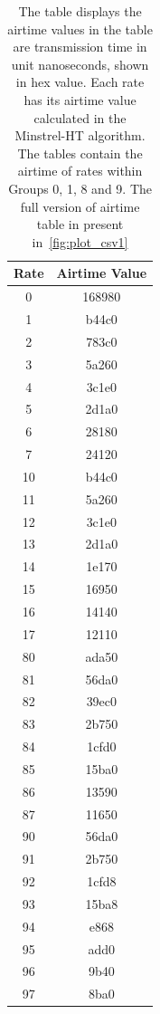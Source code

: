 \begin{table}[ht]
    \centering
    \begin{tabular}{|c|c|}
        \hline
        \textbf{Rate} & \textbf{Airtime Value} \\
        \hline
        0 & 168980 \\
        1 & b44c0 \\
        2 & 783c0 \\
        3 & 5a260 \\
        4 & 3c1e0 \\
        5 & 2d1a0 \\
        6 & 28180 \\
        7 & 24120 \\
        10 & b44c0 \\
        11 & 5a260 \\
        12 & 3c1e0 \\
        13 & 2d1a0 \\
        14 & 1e170 \\
        15 & 16950 \\
        16 & 14140 \\
        17 & 12110 \\
        80 & ada50 \\
        81 & 56da0 \\
        82 & 39ec0 \\
        83 & 2b750 \\
        84 & 1cfd0 \\
        85 & 15ba0 \\
        86 & 13590 \\
        87 & 11650 \\
        90 & 56da0 \\
        91 & 2b750 \\
        92 & 1cfd8 \\
        93 & 15ba8 \\
        94 & e868 \\
        95 & add0 \\
        96 & 9b40 \\
        97 & 8ba0 \\
        \hline
    \end{tabular}
    \caption[Airtime Value For Transmission Rates]{The table displays the airtime values in the table are transmission time in unit nanoseconds, shown in hex value.  Each rate has its airtime value calculated in the Minstrel-HT algorithm. The tables contain the airtime of rates within Groups 0, 1, 8 and 9. The full version of airtime table in present in~\ref{fig:plot_csv1}}
    \label{tab:airtime-success}
\end{table}

